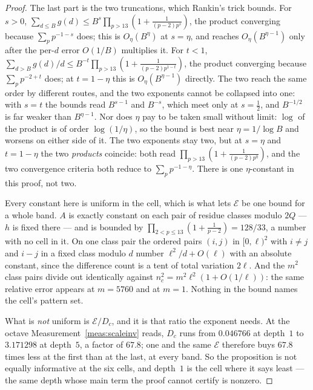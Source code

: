 \documentclass[11pt,a4paper]{article}
\theoremstyle{plain}
\theoremstyle{definition}
\theoremstyle{remark}
\begin{document}
\begin{proof}
The last part is the two truncations, which Rankin's trick bounds.
For $s>0$, $\sum_{d\le B}g(d)\le B^{s}\prod_{p>13}(1+\frac1{(p-2)p^{s}})$,
the product converging because $\sum_p p^{-1-s}$ does; this is
$O_\eta(B^{\eta})$ at $s=\eta$, and reaches $O_\eta(B^{\eta-1})$ only
after the per-$d$ error $O(1/B)$ multiplies it. For $t<1$,
$\sum_{d>B}g(d)/d\le B^{-t}\prod_{p>13}(1+\frac1{(p-2)p^{1-t}})$, the
product converging because $\sum_p p^{-2+t}$ does; at $t=1-\eta$ this
is $O_\eta(B^{\eta-1})$ directly. The two reach the same order by
different routes, and the two exponents cannot be collapsed into one:
with $s=t$ the bounds read $B^{s-1}$ and $B^{-s}$, which meet only at
$s=\tfrac12$, and $B^{-1/2}$ is far weaker than $B^{\eta-1}$. Nor does
$\eta$ pay to be taken small without limit: $\log$ of the product is
of order $\log(1\!/\!\eta)$, so the bound is best near
$\eta=1/\!\log B$ and worsens on either side of it. The two exponents
stay two, but at $s=\eta$ and $t=1-\eta$ the two \emph{products}
coincide: both read $\prod_{p>13}(1+\frac1{(p-2)p^{\eta}})$, and the
two convergence criteria both reduce to $\sum_p p^{-1-\eta}$. There is
one $\eta$-constant in this proof, not two.

Every constant here is uniform in the cell, which is what lets
$\mathcal E$ be one bound for a whole band. $A$ is exactly constant on
each pair of residue classes modulo $2Q$ --- $h$ is fixed there --- and
is bounded by $\prod_{2<p\le13}(1+\frac1{p-2})=128/33$, a number with
no cell in it. On one class pair the ordered pairs $(i,j)$ in
$[0,\ell)^2$ with $i\ne j$ and $i-j$ in a fixed class modulo $d$ number
$\ell^2/d+O(\ell)$ with an absolute constant, since the difference
count is a tent of total variation $2\ell$. And the $m^2$ class pairs
divide out identically against $n_c^2=m^2\ell^2(1+O(1/\ell))$: the same relative
error appears at $m=5760$ and at $m=1$. Nothing in the bound names the
cell's pattern set.

What is \emph{not} uniform is $\mathcal E/D_c$, and it is that ratio
the exponent needs. At the octave Measurement~\ref{meas:scaleinv}
reads, $D_c$ runs from $0.046766$ at depth~$1$ to $3.171298$ at
depth~$5$, a factor of $67.8$; one and the same $\mathcal E$ therefore
buys $67.8$ times less at the first than at the last, at every band.
So the proposition is not equally informative at the six cells, and
depth~$1$ is the cell where it says least --- the same depth whose main
term the proof cannot certify is nonzero.


\end{proof}
\end{document}
